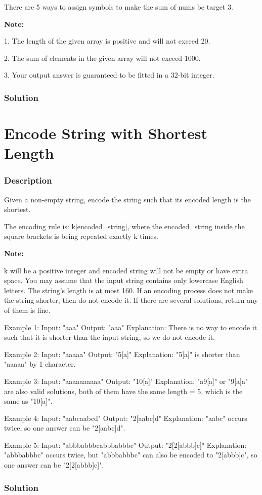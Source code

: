 There are 5 ways to assign symbols to make the sum of nums be target 3.

\textbf{Note:}

1. The length of the given array is positive and will not exceed 20.

2. The sum of elements in the given array will not exceed 1000.

3. Your output answer is guaranteed to be fitted in a 32-bit integer.

\subsubsection{Solution}

\begin{Code}

\end{Code}

\newpage

\section{Encode String with Shortest Length} %

\subsubsection{Description}
Given a non-empty string, encode the string such that its encoded length is the shortest.

The encoding rule is: k[encoded_string], where the encoded_string inside the square brackets is being repeated exactly k times.

\textbf{Note:}

\begin{Code}
k will be a positive integer and encoded string will not be empty or have extra space.
You may assume that the input string contains only lowercase English letters. The string's length is at most 160.
If an encoding process does not make the string shorter, then do not encode it. If there are several solutions, return any of them is fine.

Example 1:
Input: "aaa"
Output: "aaa"
Explanation: There is no way to encode it such that it is shorter than the input string, so we do not encode it.

Example 2:
Input: "aaaaa"
Output: "5[a]"
Explanation: "5[a]" is shorter than "aaaaa" by 1 character.

Example 3:
Input: "aaaaaaaaaa"
Output: "10[a]"
Explanation: "a9[a]" or "9[a]a" are also valid solutions, both of them have the same length = 5, which is the same as "10[a]".

Example 4:
Input: "aabcaabcd"
Output: "2[aabc]d"
Explanation: "aabc" occurs twice, so one answer can be "2[aabc]d".

Example 5:
Input: "abbbabbbcabbbabbbc"
Output: "2[2[abbb]c]"
Explanation: "abbbabbbc" occurs twice, but "abbbabbbc" can also be encoded to "2[abbb]c", so one answer can be "2[2[abbb]c]".
\end{Code}
\subsubsection{Solution}

\begin{Code}

\end{Code}

\newpage